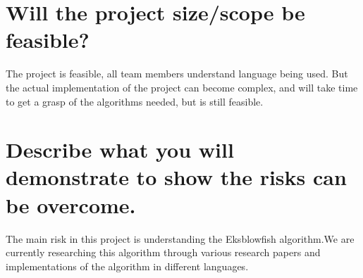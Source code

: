 \documentclass[12pt]{article}
\begin{document}
\section*{Will the project size/scope be feasible?}

	The project is feasible, all team members understand language being used. But the actual implementation of the project can become complex, and will take time to get a grasp of the algorithms needed, but is still feasible.

\section*{Describe what you will demonstrate to show the risks can be overcome.}

	The main risk in this project is understanding the Eksblowfish algorithm.We are currently researching this algorithm through various research papers and implementations of the algorithm in different languages.
\end{document}
